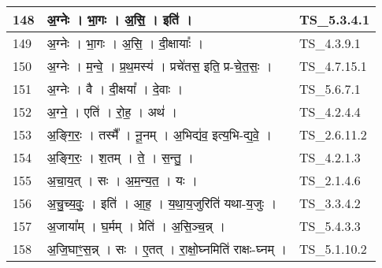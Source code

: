 \documentclass[17pt]{extarticle}
\begin{document}
\begin{longtable}{||p{0.4in}||p{4.9in}||p{0.9in}||}
    \hline
        
    148 & अ॒ग्नेः   ।   भा॒गः   ।   अ॒सि॒   ।   इति॑   ।    & TS\_5.3.4.1       \\
    
    \hline
        
    149 & अ॒ग्नेः   ।   भा॒गः   ।   अ॒सि॒   ।   दी॒क्षायाः᳚   ।    & TS\_4.3.9.1       \\
    
    \hline
        
    150 & अ॒ग्नेः   ।   म॒न्वे॒   ।   प्र॒थ॒मस्य॑   ।   प्रचे॑तस॒ इति॒ प्र{-}चे॒त॒सः॒   ।    & TS\_4.7.15.1       \\
    
    \hline
        
    151 & अ॒ग्नेः   ।   वै   ।   दी॒क्षया᳚   ।   दे॒वाः   ।    & TS\_5.6.7.1       \\
    
    \hline
        
    152 & अ॒ग्ने॒   ।   एति॑   ।   रो॒ह॒   ।   अथ॑   ।    & TS\_4.2.4.4       \\
    
    \hline
        
    153 & अ॒ङ्गि॒रः॒   ।   तस्मै᳚   ।   नू॒नम्   ।   अ॒भिद्य॑व॒ इत्य॒भि{-}द्य॒वे॒   ।    & TS\_2.6.11.2       \\
    
    \hline
        
    154 & अ॒ङ्गि॒रः॒   ।   श॒तम्   ।   ते॒   ।   स॒न्तु॒   ।    & TS\_4.2.1.3       \\
    
    \hline
        
    155 & अ॒चा॒य॒त्   ।   सः   ।   अ॒म॒न्य॒त॒   ।   यः   ।    & TS\_2.1.4.6       \\
    
    \hline
        
    156 & अ॒चु॒च्य॒वुः॒   ।   इति॑   ।   आ॒ह॒   ।   य॒था॒य॒जुरिति॑ यथा{-}य॒जुः   ।    & TS\_3.3.4.2       \\
    
    \hline
        
    157 & अ॒जाया᳚म्   ।   घ॒र्मम्   ।   प्रेति॑   ।   अ॒सि॒ञ्च॒न्न्   ।    & TS\_5.4.3.3       \\
    
    \hline
        
    158 & अ॒जि॒घाꣳ॒॒स॒न्न्   ।   सः   ।   ए॒तत्   ।   रा॒क्षो॒घ्नमिति॑ राक्षः{-}घ्नम्   ।    & TS\_5.1.10.2       \\
    

\end{longtable}
\end{document}

